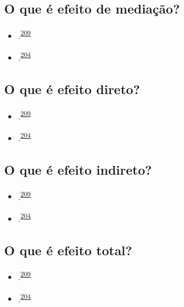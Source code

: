 \documentclass[
  a4paper,
]{book}
\begin{document}
\hypertarget{o-que-uxe9-efeito-de-mediauxe7uxe3o}{%
\subsection{O que é efeito de mediação?}\label{o-que-uxe9-efeito-de-mediauxe7uxe3o}}

\begin{itemize}
\item
  .\textsuperscript{\protect\hyperlink{ref-Baron1986}{209}}
\item
  .\textsuperscript{\protect\hyperlink{ref-Bours2023}{204}}
\end{itemize}

\hypertarget{o-que-uxe9-efeito-direto}{%
\subsection{O que é efeito direto?}\label{o-que-uxe9-efeito-direto}}

\begin{itemize}
\item
  .\textsuperscript{\protect\hyperlink{ref-Baron1986}{209}}
\item
  .\textsuperscript{\protect\hyperlink{ref-Bours2023}{204}}
\end{itemize}

\hypertarget{o-que-uxe9-efeito-indireto}{%
\subsection{O que é efeito indireto?}\label{o-que-uxe9-efeito-indireto}}

\begin{itemize}
\item
  .\textsuperscript{\protect\hyperlink{ref-Baron1986}{209}}
\item
  .\textsuperscript{\protect\hyperlink{ref-Bours2023}{204}}
\end{itemize}

\hypertarget{o-que-uxe9-efeito-total}{%
\subsection{O que é efeito total?}\label{o-que-uxe9-efeito-total}}

\begin{itemize}
\item
  .\textsuperscript{\protect\hyperlink{ref-Baron1986}{209}}
\item
  .\textsuperscript{\protect\hyperlink{ref-Bours2023}{204}}
\end{itemize}
\end{document}
